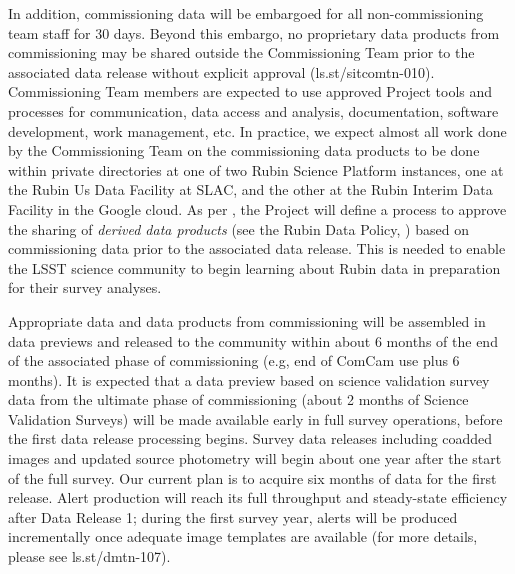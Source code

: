 In addition, commissioning data will be embargoed for all non-commissioning team staff for 30 days. 
Beyond this embargo, no proprietary data products from commissioning may be shared outside the Commissioning Team prior to the associated data release without explicit approval (ls.st/sitcomtn-010). 
Commissioning Team members are expected to use approved Project tools and processes for communication, data access and analysis, documentation, software development, work management, etc.
In practice, we expect almost all work done by the Commissioning Team on the commissioning data products to be done within private directories at one of two Rubin Science Platform instances, one at the Rubin Us Data Facility at SLAC, and the other at the Rubin Interim Data Facility in the Google cloud.
As per , the Project will define a process to approve the sharing of {\it derived data products} (see the Rubin Data Policy, ) based on commissioning data prior to the associated data release.
This is needed to enable the LSST science community to begin learning about Rubin data in preparation for their survey analyses. 

Appropriate data and data products from commissioning will be assembled in data previews  and released to the community within about 6 months of the end of the associated phase of commissioning (e.g, end of ComCam use plus 6 months).
It is expected that a data preview based on science validation survey data from the ultimate phase of commissioning (about 2 months of Science Validation Surveys) will be made available early in full survey operations, before the first data release processing begins.
Survey data releases including coadded images and updated source photometry will begin about one year after the start of the full survey. 
Our current plan is to acquire six months of data for the first release.
Alert production will reach its full throughput and steady-state efficiency after Data Release 1; during the first survey year, alerts will be produced incrementally once adequate image templates are available (for more details, please see ls.st/dmtn-107). 

